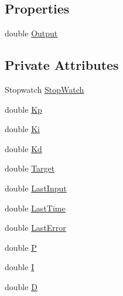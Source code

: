 \subsection*{Properties}
\begin{DoxyCompactItemize}
\item 
double \hyperlink{class_robotics_library_1_1_controllers_1_1_p_i_d_ad175e1d1ace320079e4a6861e6b8507f}{Output}
\end{DoxyCompactItemize}
\subsection*{Private Attributes}
\begin{DoxyCompactItemize}
\item 
Stopwatch \hyperlink{class_robotics_library_1_1_controllers_1_1_p_i_d_ab02462db302470b8d9cd7a1fa4942a3b}{Stop\+Watch}
\item 
double \hyperlink{class_robotics_library_1_1_controllers_1_1_p_i_d_a4764d2e429482ed1f8391e99e41a7e88}{Kp}
\item 
double \hyperlink{class_robotics_library_1_1_controllers_1_1_p_i_d_a11e36b7dec5f85a7a0b209288059aa3f}{Ki}
\item 
double \hyperlink{class_robotics_library_1_1_controllers_1_1_p_i_d_acd3c1beab5e18d1e6a50bc3164a8bec1}{Kd}
\item 
double \hyperlink{class_robotics_library_1_1_controllers_1_1_p_i_d_af5293a3d22a040b5a88ff0240fe01870}{Target}
\item 
double \hyperlink{class_robotics_library_1_1_controllers_1_1_p_i_d_a99e787972aaf50f5b782cd90ca75c068}{Last\+Input}
\item 
double \hyperlink{class_robotics_library_1_1_controllers_1_1_p_i_d_a9a078bef8de8d74d96e92efc843848ef}{Last\+Time}
\item 
double \hyperlink{class_robotics_library_1_1_controllers_1_1_p_i_d_a2bfa38b888c2dbd356aa74ad4ceb8674}{Last\+Error}
\item 
double \hyperlink{class_robotics_library_1_1_controllers_1_1_p_i_d_aba6336d67bfd9401b9458fce455ce7cf}{P}
\item 
double \hyperlink{class_robotics_library_1_1_controllers_1_1_p_i_d_a3745482662e7162489cbed24ac316b40}{I}
\item 
double \hyperlink{class_robotics_library_1_1_controllers_1_1_p_i_d_a35a8a9c4e87affebf4634c3a105a47c4}{D}
\end{DoxyCompactItemize}


